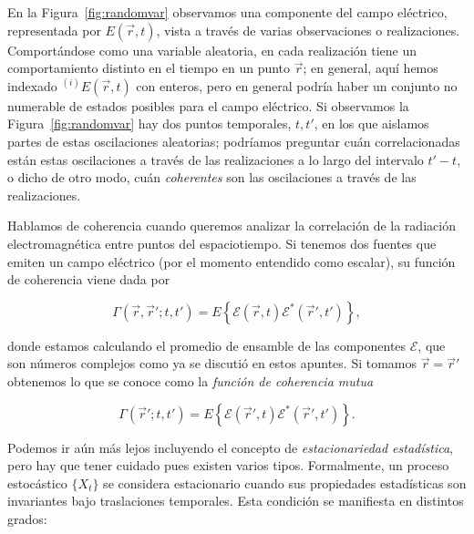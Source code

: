 	En la Figura~\ref{fig:randomvar} observamos una componente del campo eléctrico, representada por $E(\vec{r},t)$, vista a través de varias observaciones o realizaciones. Comportándose como una variable aleatoria, en cada realización tiene un comportamiento distinto en el tiempo en un punto $\vec{r}$; en general, aquí hemos indexado $^{(i)}E(\vec{r},t)$ con enteros, pero en general podría haber un conjunto no numerable de estados posibles para el campo eléctrico. Si observamos la Figura~\ref{fig:randomvar} hay dos puntos temporales, $t,t'$, en los que aislamos partes de estas oscilaciones aleatorias; podríamos preguntar cuán correlacionadas están estas oscilaciones a través de las realizaciones a lo largo del intervalo $t'-t$, o dicho de otro modo, cuán \textit{coherentes} son las oscilaciones a través de las realizaciones.

	Hablamos de coherencia cuando queremos analizar la correlación de la radiación electromagnética entre puntos del espaciotiempo. Si tenemos dos fuentes que emiten un campo eléctrico (por el momento entendido como escalar), su función de coherencia viene dada por

	\begin{equation}
		\Gamma(\vec{r},\vec{r}';t,t') = E \left\{ \mathcal{E} (\vec{r},t) \mathcal{E}^*(\vec{r}',t') \right\},
	\end{equation}

	donde estamos calculando el promedio de ensamble de las componentes $\mathcal{E}$, que son números complejos como ya se discutió en estos apuntes. Si tomamos $\vec{r}=\vec{r}'$ obtenemos lo que se conoce como la \textit{función de coherencia mutua}

	\begin{equation}
		\Gamma(\vec{r}';t,t') = E \left\{ \mathcal{E}(\vec{r}',t) \mathcal{E}^*(\vec{r}',t') \right\}.
	\end{equation}

	Podemos ir aún más lejos incluyendo el concepto de \textit{estacionariedad estadística}, pero hay que tener cuidado pues existen varios tipos. Formalmente, un proceso estocástico $\{X_t\}$ se considera estacionario cuando sus propiedades estadísticas son invariantes bajo traslaciones temporales. Esta condición se manifiesta en distintos grados:

